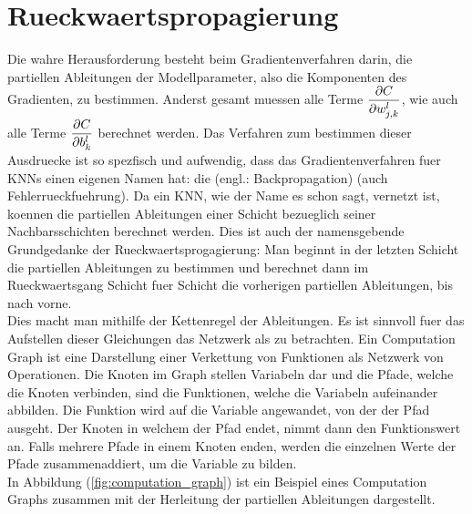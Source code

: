 \para{}
\cite{wiki:normal_distribution}
\cite{Nielsen}

\section{Rueckwaertspropagierung}\label{sec:backpropagation}
Die wahre Herausforderung besteht beim Gradientenverfahren darin,
die partiellen Ableitungen der Modellparameter,
also die Komponenten des Gradienten, zu bestimmen.
Anderst gesamt muessen alle Terme
$\displaystyle\frac{\partial C}{\partial w_{j,k}^l}$, wie auch alle Terme $\displaystyle\frac{\partial C}{\partial b_k^l}$
berechnet werden.
Das Verfahren zum bestimmen dieser Ausdruecke ist so spezfisch und aufwendig,
dass das Gradientenverfahren fuer KNNs einen eigenen Namen hat: die
 (engl.: Backpropagation) (auch Fehlerrueckfuehrung).
\para{}
Da ein KNN, wie der Name es schon sagt, vernetzt ist, koennen die partiellen
Ableitungen einer Schicht bezueglich seiner Nachbarsschichten berechnet werden.
Dies ist auch der namensgebende Grundgedanke der Rueckwaertsprogagierung: Man
beginnt in der letzten Schicht die partiellen Ableitungen zu bestimmen und
berechnet dann im Rueckwaertsgang Schicht fuer Schicht die vorherigen
partiellen Ableitungen, bis nach vorne. \\
Dies macht man mithilfe der Kettenregel der Ableitungen.
Es ist sinnvoll fuer das Aufstellen dieser Gleichungen das Netzwerk als
 zu betrachten.
\para{}
Ein Computation Graph ist eine Darstellung einer Verkettung von Funktionen als Netzwerk von Operationen.
Die Knoten im Graph stellen Variabeln dar und die Pfade, welche die Knoten
verbinden, sind die Funktionen, welche die Variabeln aufeinander abbilden. Die
Funktion wird auf die Variable angewandet, von der der Pfad ausgeht. Der Knoten
in welchem der Pfad endet, nimmt dann den Funktionswert an. Falls
mehrere Pfade in einem Knoten enden, werden die einzelnen Werte der Pfade
zusammenaddiert, um die Variable zu bilden. \\
In Abbildung (\ref{fig:computation_graph}) ist ein Beispiel eines Computation
Graphs zusammen mit der Herleitung der partiellen Ableitungen dargestellt.
\para{}
